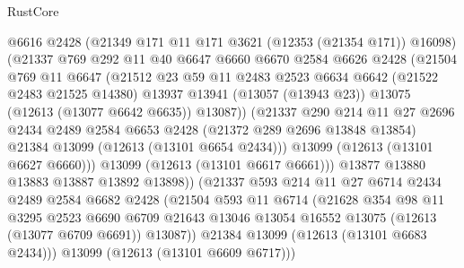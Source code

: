 \begin{lexlean}{RustCore}
\begin{coremodule}
                  @6616
                  @2428
                  (@21349 @171 @11 @171 @3621 (@12353 (@21354 @171)) @16098)
                  (@21337
                    @769
                    @292
                    @11
                    @40
                    @6647
                    @6660
                    @6670
                    @2584
                    @6626
                    @2428
                    (@21504
                      @769
                      @11
                      @6647
                      (@21512
                        @23
                        @59
                        @11
                        @2483
                        @2523
                        @6634
                        @6642
                        (@21522 @2483 @21525 @14380)
                        @13937
                        @13941
                        (@13057 (@13943 @23))
                        @13075
                        (@12613 (@13077 @6642 @6635))
                        @13087))
                    (@21337
                      @290
                      @214
                      @11
                      @27
                      @2696
                      @2434
                      @2489
                      @2584
                      @6653
                      @2428
                      (@21372 @289 @2696 @13848 @13854)
                      @21384
                      @13099
                      (@12613 (@13101 @6654 @2434)))
                    @13099
                    (@12613 (@13101 @6627 @6660)))
                  @13099
                  (@12613 (@13101 @6617 @6661)))
                @13877
                @13880
                @13883
                @13887
                @13892
                @13898))
            (@21337
              @593
              @214
              @11
              @27
              @6714
              @2434
              @2489
              @2584
              @6682
              @2428
              (@21504
                @593
                @11
                @6714
                (@21628
                  @354
                  @98
                  @11
                  @3295
                  @2523
                  @6690
                  @6709
                  @21643
                  @13046
                  @13054
                  @16552
                  @13075
                  (@12613 (@13077 @6709 @6691))
                  @13087))
              @21384
              @13099
              (@12613 (@13101 @6683 @2434)))
            @13099
            (@12613 (@13101 @6609 @6717)))

\end{coremodule}
\end{lexlean}
